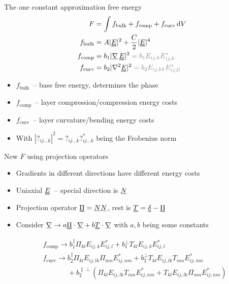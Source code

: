 \documentclass[10pt,mathserif]{beamer}
\newcommand{\suf}[2]{\stackunder[0.5pt]{\stackunder[1pt]{\ensuremath{#1}}{\rule{\widthof{\ensuremath{#2}}*\real{0.9}}{.1ex}}}{}}
\newcommand{\duf}[2]{\stackunder[0.5pt]{\stackunder[0.8pt]{\stackunder[1pt]{\ensuremath{#1}}{\rule{\widthof{\ensuremath{#2}}*\real{0.9}}{.1ex}}}{\rule{\widthof{\ensuremath{#2}}*\real{0.9}}{.1ex}}}{}}
\newcommand{\su}[1]{\suf{#1}{#1}}
\newcommand{\du}[1]{\duf{#1}{#1}}
\newcommand{\mgrad}{\ensuremath{\suf{\nabla}{K}\,}}
\newcommand{\EE}{\ensuremath{\du{E}}}
\newcommand{\FB}{\ensuremath{f_\text{bulk}}}
\newcommand{\FC}{\ensuremath{f_\text{comp}}}
\newcommand{\FU}{\ensuremath{f_\text{curv}}}
\newcommand{\onedot}{$\mathsurround0pt\ldotp$}
\newcommand{\cddot}{\mathbin{
    \vcenter{\baselineskip1ex \vspace{-0.1ex}\hbox{\onedot}\hbox{\onedot}}
}}
\newcommand{\extra}[1]{\color{gray} #1 \normalcolor}
\begin{document}
\begin{frame}[fragile]{The one constant approximation free energy}
    \newrefsection
    \begin{align*}
        F &= \int f_\text{bulk} + f_\text{comp} + f_\text{curv} \dd{V} \\
        f_\text{bulk} &= A |\EE|^2 + \frac{C}{2} |\EE|^4 \\
        f_\text{comp} &= b_1 |\mgrad \EE|^2 \color{gray} = b_1 E_{ij,k}E_{ij,k}^* \\
        f_\text{curv} &= b_2 |\nabla^2 \EE|^2 \color{gray} = b_2 E_{ij,kk}E_{ij,ll}^*
    \end{align*}
    \begin{itemize}
        \item \FB\ -- base free energy, determines the phase
        \item \FC\ -- layer compression/compression energy costs
        \item \FU\ -- layer curvature/bending energy costs
        \extra{\item With $|?_{ij\ldots k}|^2=?_{ij\ldots k}?_{ij\ldots k}^*$ being the Frobenius norm}
    \end{itemize}
\end{frame}

\begin{frame}[fragile]{New $F$ using projection operators}
    \newrefsection
    \begin{itemize}
        \item Gradients in different directions have different energy costs
        \item Uniaxial \EE\ -- special direction is $\su{N}$
        \item Projection operator $\du{\Pi}=\su{N}\su{N}$, rest is $\du{T} = \du{\delta} - \du{\Pi}$
        \extra{\item Consider $\su{\nabla} \rightarrow a \du{\Pi}\cdot\su{\nabla} + b \du{T}\cdot\su{\nabla}$ with $a, b$ being some constants}
    \end{itemize}

    \begin{align*}
        &f_\text{comp} \rightarrow b_1^\parallel \Pi_{kl} E_{ij,k}E_{ij,l}^* + b_1^\perp T_{kl} E_{ij,k}E_{ij,l}^* \\
        &f_\text{curv} \rightarrow b_2^\parallel \Pi_{kl}E_{ij,lk}\Pi_{mn}E_{ij,nm}^* + b_2^\perp T_{kl}E_{ij,lk}T_{mn}E_{ij,nm}^* \\
        &\phantom{f_\text{curv} \rightarrow}+ b_2^{\parallel\perp}(\Pi_{kl}E_{ij,lk}T_{mn}E_{ij,nm}^* + T_{kl}E_{ij,lk}\Pi_{mn}E_{ij,nm}^*)
    \end{align*}

\end{frame}
\end{document}
